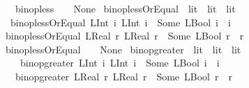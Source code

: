 \begin{isabellebody}
\ \ {\isacharbar}{\kern0pt}\ {\isachardoublequoteopen}binop{\isacharunderscore}{\kern0pt}less\ {\isacharunderscore}{\kern0pt}\ {\isacharunderscore}{\kern0pt}\ {\isacharequal}{\kern0pt}\ None{\isachardoublequoteclose}\isanewline
\isanewline
{}\isamarkupfalse%
\ binop{\isacharunderscore}{\kern0pt}lessOrEqual\ {\isacharcolon}{\kern0pt}{\isacharcolon}{\kern0pt}\ {\isachardoublequoteopen}lit\ {\isasymRightarrow}\ lit\ {\isasymrightharpoonup}\ lit{\isachardoublequoteclose}\isanewline
{}\isanewline
\ \ {\isachardoublequoteopen}binop{\isacharunderscore}{\kern0pt}lessOrEqual\ {\isacharparenleft}{\kern0pt}LInt\ i{}{\isacharparenright}{\kern0pt}\ {\isacharparenleft}{\kern0pt}LInt\ i{}{\isacharparenright}{\kern0pt}\ {\isacharequal}{\kern0pt}\ Some\ {\isacharparenleft}{\kern0pt}LBool\ {\isacharparenleft}{\kern0pt}i{}\ {\isasymle}\ i{}{\isacharparenright}{\kern0pt}{\isacharparenright}{\kern0pt}{\isachardoublequoteclose}\isanewline
{\isacharbar}{\kern0pt}\ {\isachardoublequoteopen}binop{\isacharunderscore}{\kern0pt}lessOrEqual\ {\isacharparenleft}{\kern0pt}LReal\ r{}{\isacharparenright}{\kern0pt}\ {\isacharparenleft}{\kern0pt}LReal\ r{}{\isacharparenright}{\kern0pt}\ {\isacharequal}{\kern0pt}\ Some\ {\isacharparenleft}{\kern0pt}LBool\ {\isacharparenleft}{\kern0pt}r{}\ {\isasymle}\ r{}{\isacharparenright}{\kern0pt}{\isacharparenright}{\kern0pt}{\isachardoublequoteclose}\isanewline
{\isacharbar}{\kern0pt}\ {\isachardoublequoteopen}binop{\isacharunderscore}{\kern0pt}lessOrEqual\ {\isacharunderscore}{\kern0pt}\ {\isacharunderscore}{\kern0pt}\ {\isacharequal}{\kern0pt}\ None{\isachardoublequoteclose}\isanewline
\isanewline
{}\isamarkupfalse%
\ binop{\isacharunderscore}{\kern0pt}greater\ {\isacharcolon}{\kern0pt}{\isacharcolon}{\kern0pt}\ {\isachardoublequoteopen}lit\ {\isasymRightarrow}\ lit\ {\isasymrightharpoonup}\ lit{\isachardoublequoteclose}\isanewline
\ \ \isanewline
\ \ \ \ {\isachardoublequoteopen}binop{\isacharunderscore}{\kern0pt}greater\ {\isacharparenleft}{\kern0pt}LInt\ i{}{\isacharparenright}{\kern0pt}\ {\isacharparenleft}{\kern0pt}LInt\ i{}{\isacharparenright}{\kern0pt}\ {\isacharequal}{\kern0pt}\ Some\ {\isacharparenleft}{\kern0pt}LBool\ {\isacharparenleft}{\kern0pt}i{}\ {\isachargreater}{\kern0pt}\ i{}{\isacharparenright}{\kern0pt}{\isacharparenright}{\kern0pt}{\isachardoublequoteclose}\isanewline
\ \ {\isacharbar}{\kern0pt}\ {\isachardoublequoteopen}binop{\isacharunderscore}{\kern0pt}greater\ {\isacharparenleft}{\kern0pt}LReal\ r{}{\isacharparenright}{\kern0pt}\ {\isacharparenleft}{\kern0pt}LReal\ r{}{\isacharparenright}{\kern0pt}\ {\isacharequal}{\kern0pt}\ Some\ {\isacharparenleft}{\kern0pt}LBool\ {\isacharparenleft}{\kern0pt}r{}\ {\isachargreater}{\kern0pt}\ r{}{\isacharparenright}{\kern0pt}{\isacharparenright}{\kern0pt}{\isachardoublequoteclose}\isanewline

\end{isabellebody}
